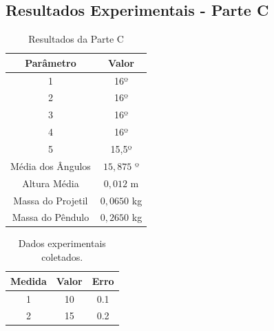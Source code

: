 \documentclass{report}
\begin{document}
\subsection{Resultados Experimentais - Parte C}
\begin{table}[H]
    \centering
    \begin{tabular}{|c|c|}
        \hline
        \textbf{Parâmetro} & \textbf{Valor} \\
        \hline
        1 & 16º \\
        2 & 16º \\
        3 & 16º \\
        4 & 16º \\
        5 & 15,5º \\
        \hline
        Média dos Ângulos & $15,875$ º \\
        Altura Média & $0,012$ m \\
        \hline
        Massa do Projetil & $0,0650$ kg \\
        Massa do Pêndulo & $0,2650$ kg \\
        \hline
    \end{tabular}
    \caption{Resultados da Parte C}
    \label{tab:parte_c}
\end{table}

\begin{table}[H]
\centering
\begin{tabular}{|c|c|c|}
\hline
\textbf{Medida} & \textbf{Valor} & \textbf{Erro} \\ \hline
1               & 10             & 0.1           \\ \hline
2               & 15             & 0.2           \\ \hline
\end{tabular}
\caption{Dados experimentais coletados.}
\label{tab:dados}
\end{table}

\printbibliography
\end{document}
